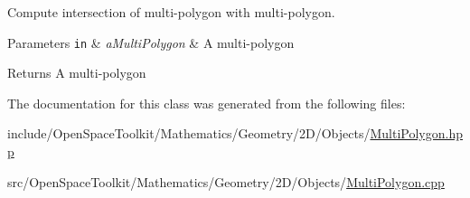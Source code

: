 Compute intersection of multi-\/polygon with multi-\/polygon. 


\begin{DoxyParams}[1]{Parameters}
\mbox{\tt in}  & {\em a\+Multi\+Polygon} & A multi-\/polygon \\
\hline
\end{DoxyParams}
\begin{DoxyReturn}{Returns}
A multi-\/polygon 
\end{DoxyReturn}


The documentation for this class was generated from the following files\+:\begin{DoxyCompactItemize}
\item 
include/\+Open\+Space\+Toolkit/\+Mathematics/\+Geometry/2\+D/\+Objects/\hyperlink{_multi_polygon_8hpp}{Multi\+Polygon.\+hpp}\item 
src/\+Open\+Space\+Toolkit/\+Mathematics/\+Geometry/2\+D/\+Objects/\hyperlink{_multi_polygon_8cpp}{Multi\+Polygon.\+cpp}\end{DoxyCompactItemize}
